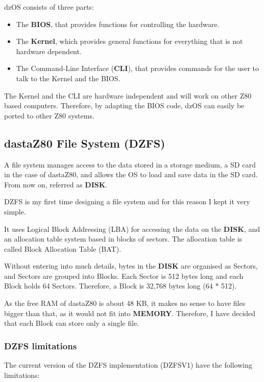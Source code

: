 \documentclass[a4paper,11pt]{article}
\begin{document}
    dzOS consists of three parts:
    \begin{itemize}
        \item The \textbf{BIOS}, that provides functions for controlling the
        hardware.
        \item The \textbf{Kernel}, which provides general functions for
        everything that is not hardware dependent.
        \item The Command-Line Interface (\textbf{CLI}), that provides commands
        for the user to talk to the Kernel and the BIOS.
    \end{itemize}

    The Kernel and the CLI are hardware independent and will work on other Z80
    based computers. Therefore, by adapting the BIOS code, dzOS can easily be
    ported to other Z80 systems.

    \subsection{dastaZ80 File System (DZFS)}
    A file system manages access to the data stored in a storage medium, a
    SD card in the case of dastaZ80, and allows the OS to load and save data in
    the SD card. From now on, referred as \textbf{DISK}.

    DZFS is my first time designing a file system and for this reason I kept it
    very simple.

    It uses Logical Block Addressing (LBA) for accessing the data on the
    \textbf{DISK}, and an allocation table system based in blocks of sectors.
    The allocation table is called Block Allocation Table (BAT).

    Without entering into much details, bytes in the \textbf{DISK} are organised
    as Sectors, and Sectors are grouped into Blocks. Each Sector is 512 bytes
    long and each Block holds 64 Sectors. Therefore, a Block is 32,768 bytes
    long (64 * 512).

    As the free RAM of dastaZ80 is about 48 KB, it makes no sense to have files
    bigger than that, as it would not fit into \textbf{MEMORY}. Therefore, I
    have decided that each Block can store only a single file.

    \subsubsection{DZFS limitations}
    The current version of the DZFS implementation (DZFSV1) have the following
    limitations:
\end{document}

